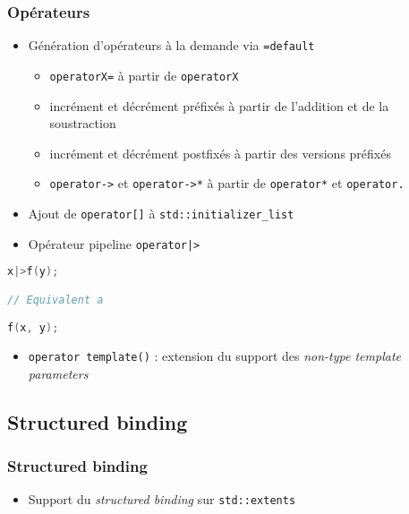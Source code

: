 \documentclass[C++.tex]{subfiles}
\begin{document}
\begin{frame}[fragile]
	\frametitle{Opérateurs}
	\begin{itemize}
		\item Génération d'opérateurs à la demande via \lstinline|=default|
		\begin{itemize}
			\item \lstinline|operatorX=| à partir de \lstinline|operatorX|
			\item incrément et décrément préfixés à partir de l'addition et de la soustraction
			\item incrément et décrément postfixés à partir des versions préfixés
			\item \lstinline|operator->| et \lstinline|operator->*| à partir de \lstinline|operator*| et \lstinline|operator.|


		\end{itemize}
		\item Ajout de \lstinline|operator[]| à \lstinline|std::initializer_list|
		\item Opérateur pipeline \lstinline!operator|>!
	\end{itemize}

	\begin{lstlisting}[language=C++]
x|>f(y);

// Equivalent a

f(x, y);\end{lstlisting}

	\begin{itemize}
		\item \lstinline|operator template()| : extension du support des \textit{non-type template parameters}
	\end{itemize}
\end{frame}

\subsection*{Structured binding}
\begin{frame}[fragile]
	\frametitle{Structured binding}
	\begin{itemize}
		\item Support du \textit{structured binding} sur \lstinline|std::extents|
	\end{itemize}
\end{frame}
\end{document}
